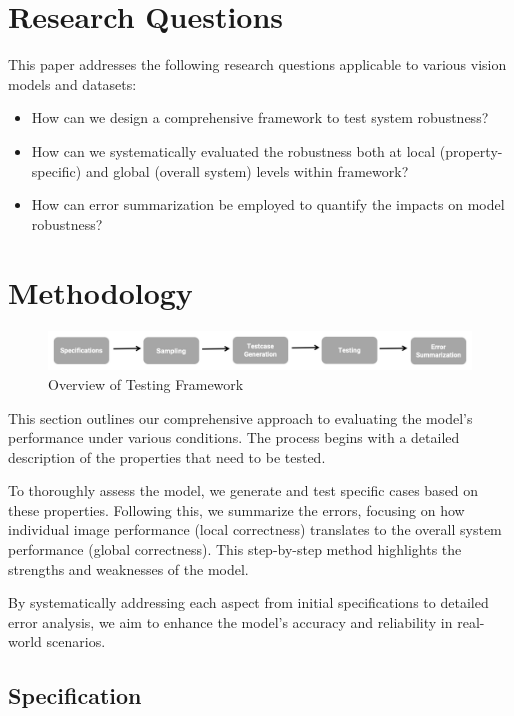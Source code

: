 \documentclass[10pt, conference, a4paper, final]{IEEEtran}
\begin{document}
\section{Research Questions}

This paper addresses the following research questions applicable to various vision models and datasets:

\begin{itemize}
    \item How can we design a comprehensive framework to test system robustness?
    \item How can we systematically evaluated the robustness both at local (property-specific) and global (overall system) levels within framework?
    \item How can error summarization be employed to quantify the impacts on model robustness?
 
\end{itemize}


\section{Methodology}
\begin{figure}{}
    \centering
    \includegraphics[width=\linewidth]{paper_images/frame.pdf}
    \caption{Overview of Testing Framework}
    \label{fig:graph}
\end{figure}

This section outlines our comprehensive approach to evaluating the model's performance under various conditions. The process begins with a detailed description of the properties that need to be tested.

To thoroughly assess the model, we generate and test specific cases based on these properties. Following this, we summarize the errors, focusing on how individual image performance (local correctness) translates to the overall system performance (global correctness). This step-by-step method highlights the strengths and weaknesses of the model.

By systematically addressing each aspect from initial specifications to detailed error analysis, we aim to enhance the model's accuracy and reliability in real-world scenarios.

\subsection{Specification}
\end{document}
